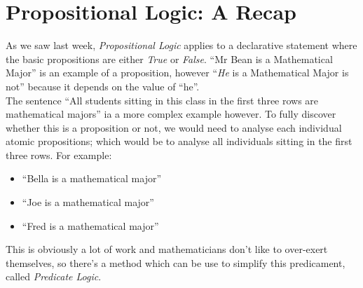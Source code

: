 
\section{Propositional Logic: A Recap}
As we saw last week, \textit{Propositional Logic} applies to a declarative statement where the basic propositions are either \textit{True} or \textit{False}. ``Mr Bean is a Mathematical Major'' is an example of a proposition, however ``\textit{He} is a Mathematical Major is not'' because it depends on the value of ``he''. \\

The sentence ``All students sitting in this class in the first three rows are mathematical majors'' ia a more complex example however. To fully discover whether this is a proposition or not, we would need to analyse each individual atomic propositions; which would be to analyse all individuals sitting in the first three rows. For example:
\begin{itemize}
    \item ``Bella is a mathematical major''
    \item ``Joe is a mathematical major''
    \item ``Fred is a mathematical major''
\end{itemize}
This is obviously a lot of work and mathematicians don't like to over-exert themselves, so there's a method which can be use to simplify this predicament, called \textit{Predicate Logic}.

